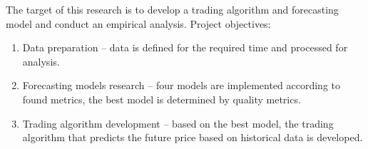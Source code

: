 The target of this research is to develop a trading algorithm and forecasting model and conduct an empirical analysis. 
Project objectives:
\begin{enumerate}
    \item Data preparation – data is defined for the required time and processed for analysis.
    \item Forecasting models research – four models are implemented according to found metrics, the best model is determined by quality metrics.
    \item Trading algorithm development – based on the best model, the trading algorithm that predicts the future price based on historical data is developed.
\end{enumerate}